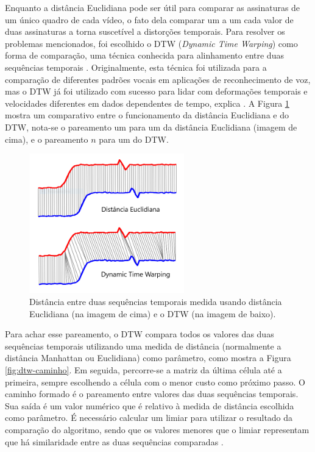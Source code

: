 Enquanto a distância Euclidiana pode ser útil para comparar as assinaturas de um único quadro de cada vídeo, o fato dela comparar um a um cada valor de duas assinaturas a torna suscetível a distorções temporais. Para resolver os problemas mencionados, foi escolhido o DTW (\textit{Dynamic Time Warping}) como forma de comparação, uma técnica conhecida para alinhamento entre duas sequências temporais \cite{muller2007dynamic}. Originalmente, esta técnica foi utilizada para a comparação de diferentes padrões vocais em aplicações de reconhecimento de voz, mas o DTW já foi utilizado com sucesso para lidar com deformações temporais e velocidades diferentes em dados dependentes de tempo, explica . A Figura \ref{fig:dist-comparacao} mostra um comparativo entre o funcionamento da distância Euclidiana e do DTW, nota-se o pareamento um para um da distância Euclidiana (imagem de cima), e o pareamento $n$ para um do DTW.

\begin{figure}[h]
    \centering
    \caption{Distância entre duas sequências temporais medida usando distância Euclidiana (na imagem de cima) e o DTW (na imagem de baixo).}
    \label{fig:dist-comparacao}
    \includegraphics[width=0.6\textwidth]{dados/figuras/dtw-euclidiana}
\end{figure}

Para achar esse pareamento, o DTW compara todos os valores das duas sequências temporais utilizando uma medida de distância (normalmente a distância Manhattan ou Euclidiana) como parâmetro, como mostra a Figura \ref{fig:dtw-caminho}. Em seguida, percorre-se a matriz da última célula até a primeira, sempre escolhendo a célula com o menor custo como próximo passo. O caminho formado é o pareamento entre valores das duas sequências temporais. Sua saída é um valor numérico que é relativo à medida de distância escolhida como parâmetro. É necessário calcular um limiar para utilizar o resultado da comparação do algoritmo, sendo que os valores menores que o limiar representam que há similaridade entre as duas sequências comparadas \cite{muller2007dynamic}.


